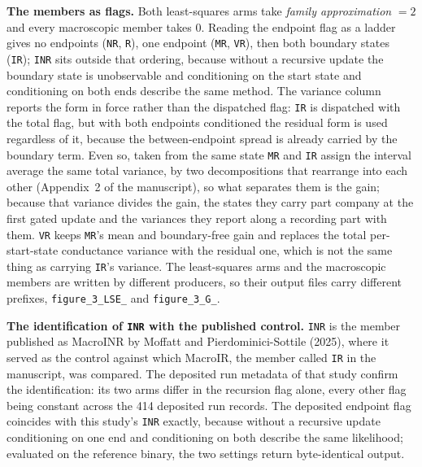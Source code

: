 \documentclass[11pt]{article}
\begin{document}
\noindent\textbf{The members as flags.} Both least-squares arms take \emph{family approximation}
$= 2$ and every macroscopic member takes $0$. Reading the endpoint flag as a ladder gives no
endpoints (\texttt{NR}, \texttt{R}), one endpoint (\texttt{MR}, \texttt{VR}), then both boundary
states (\texttt{IR}); \texttt{INR} sits outside that ordering, because without a recursive update
the boundary state is unobservable and conditioning on the start state and conditioning on both ends
describe the same method. The variance column reports the form in force rather than the dispatched
flag: \texttt{IR} is dispatched with the total flag, but with both endpoints conditioned the
residual form is used regardless of it, because the between-endpoint spread is already carried by
the boundary term. %
Even so, taken from the same state \texttt{MR} and \texttt{IR} assign the interval average the same
total variance, by two decompositions that rearrange into each other (Appendix~2 of the
manuscript), so what separates them is the gain; because that variance divides the gain, the states
they carry part company at the first gated update and the variances they report along a recording
part with them. \texttt{VR} keeps \texttt{MR}'s mean and boundary-free gain and replaces the total
per-start-state conductance variance with the residual one, which is not the same thing as carrying
\texttt{IR}'s variance. The least-squares arms and the macroscopic members are written by different
producers, so their output files carry different prefixes, \texttt{figure\_3\_LSE\_} and
\texttt{figure\_3\_G\_}.

\noindent\textbf{The identification of \texttt{INR} with the published control.} \texttt{INR} is the
member published as MacroINR by Moffatt and Pierdominici-Sottile (2025), where it served as the
control against which MacroIR, the member called \texttt{IR} in the manuscript, was compared. The
deposited run metadata of that study confirm the identification: its two arms differ in the
recursion flag alone, every other flag being constant across the 414 deposited run records. The
deposited endpoint flag coincides with this study's \texttt{INR} exactly, because without a
recursive update conditioning on one end and conditioning on both describe the same likelihood;
evaluated on the reference binary, the two settings return byte-identical output.
\end{document}

